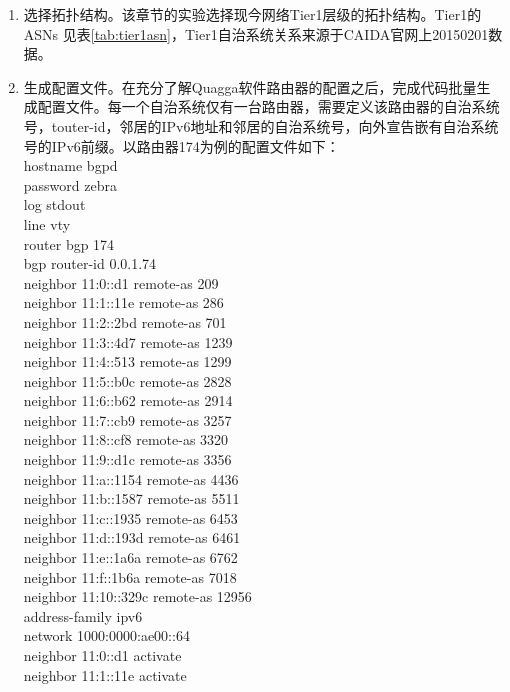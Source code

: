 \begin{enumerate}
\item 选择拓扑结构。该章节的实验选择现今网络Tier1层级\cite{tier1}的拓扑结构。Tier1的ASNs 见表\ref{tab:tier1asn}，Tier1自治系统关系来源于CAIDA官网上20150201数据。
\item 生成配置文件。在充分了解Quagga软件路由器的配置之后，完成代码批量生成配置文件。每一个自治系统仅有一台路由器，需要定义该路由器的自治系统号，touter-id，邻居的IPv6地址和邻居的自治系统号，向外宣告嵌有自治系统号的IPv6前缀。以路由器174为例的配置文件如下：\\
    hostname bgpd\\
    password zebra\\
    log stdout\\
    line vty\\
    router bgp 174\\
     bgp router-id 0.0.1.74\\
     neighbor 11:0::d1 remote-as 209\\
     neighbor 11:1::11e remote-as 286\\
     neighbor 11:2::2bd remote-as 701\\
     neighbor 11:3::4d7 remote-as 1239\\
     neighbor 11:4::513 remote-as 1299\\
     neighbor 11:5::b0c remote-as 2828\\
     neighbor 11:6::b62 remote-as 2914\\
     neighbor 11:7::cb9 remote-as 3257\\
     neighbor 11:8::cf8 remote-as 3320\\
     neighbor 11:9::d1c remote-as 3356\\
     neighbor 11:a::1154 remote-as 4436\\
     neighbor 11:b::1587 remote-as 5511\\
     neighbor 11:c::1935 remote-as 6453\\
     neighbor 11:d::193d remote-as 6461\\
     neighbor 11:e::1a6a remote-as 6762\\
     neighbor 11:f::1b6a remote-as 7018\\
     neighbor 11:10::329c remote-as 12956\\
     address-family ipv6\\
     network 1000:0000:ae00::\/64\\
     neighbor 11:0::d1  activate\\
     neighbor 11:1::11e  activate\\

\end{enumerate}
